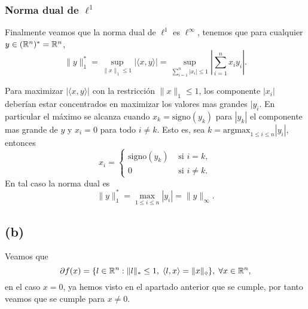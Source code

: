 \subsubsection*{Norma dual de $\ell^1$}

Finalmente veamos que la norma dual de $\ell^1$ es $\ell^\infty$,
tenemos que para cualquier $y \in (\mathbb{R}^n)^* = \mathbb{R}^n$,
\begin{equation*}
    \| y \|_{1}^{*} = \sup_{\| x \|_1 \leq 1} | \langle x, y \rangle |
        = \sup_{\sum_{i = 1}^{n} |x_i| \leq 1} \left| \sum_{i = 1}^{n} x_i y_i \right|.
\end{equation*}

Para maximizar $ | \langle x, y \rangle | $ con la restricción $\| x \|_1 \leq 1$,
los componente $|x_i|$ deberían estar concentrados en maximizar los valores mas grandes $|y_i$.
En particular el máximo se alcanza cuando $x_k = \text{signo}(y_k)$ para $|y_k|$ el componente mas grande de $y$ y $x_i = 0$ para todo $i \neq k$.
Esto es, sea $k = \text{argmax}_{1 \leq i \leq n} |y_i|$, entonces
\begin{equation*}
    x_i = \left\{
    \begin{aligned}
        \text{signo}(y_k)   & \text{ si } i = k, \\
        0                   & \text{ si } i \neq k.
    \end{aligned}
        \right.
\end{equation*}
En tal caso la norma dual es
\begin{equation*}
    \| y \|_{1}^{*} = \max_{1 \leq i \leq n} |y_i| = \| y \|_\infty.
\end{equation*}



\subsection*{(b)}

Veamos que 
\begin{equation*}
    \partial f(x) = \{ l \in \mathbb{R}^n : \| l \|_{*} \leq 1, \; \langle l, x \rangle = \| x \|_{\diamond} \}, \; \forall x \in \mathbb{R}^n,
\end{equation*}
en el caso $x = 0$, ya hemos visto en el apartado anterior que se cumple,
por tanto veamos que se cumple para $x \neq 0$.


